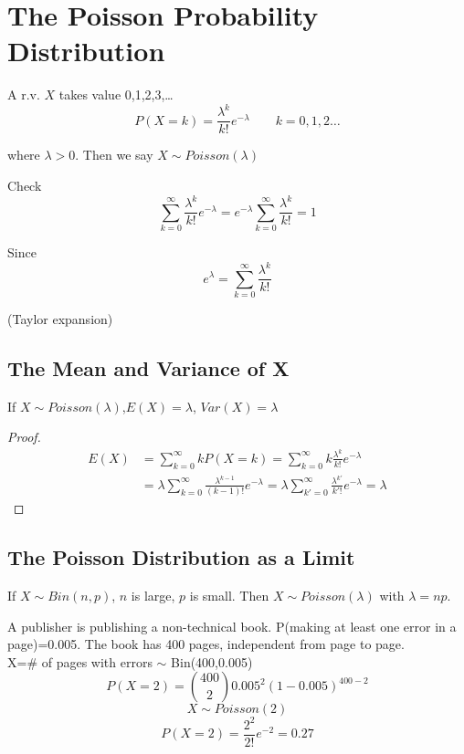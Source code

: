\section{The Poisson Probability Distribution}
\begin{defn}
A r.v. $X$ takes value 0,1,2,3,\dots
 \[P(X=k)=\frac{\lambda^k}{k!} e^{-\lambda} \qquad k=0,1,2\dots\]

where $\lambda >0$. Then we say $X \sim Poisson(\lambda)$
\end{defn}

Check
 \[\sum_{k=0}^{\infty} \frac{\lambda^k}{k!} e^{-\lambda}=e^{-\lambda} \sum_{k=0}^{\infty} \frac{\lambda^k}{k!} =1 \]

Since 
\[e^{\lambda}=\sum_{k=0}^{\infty} \frac{\lambda^k}{k!}  \]

(Taylor expansion)
\subsection{The Mean and Variance of X}
\begin{prop}
If $X \sim Poisson(\lambda)$,$E(X)=\lambda$, $Var(X)=\lambda$
\begin{proof}
\begin{align*}
E(X)&=\sum _{k=0}^{\infty}kP(X=k)=\sum _{k=0}^{\infty}  k \frac{\lambda^k}{k!} e^{-\lambda} \\
&=\lambda \sum _{k=0}^{\infty} \frac{\lambda^{k-1}}{(k-1)!} e^{-\lambda}=\lambda \sum _{k'=0}^{\infty} \frac{\lambda^{k'}}{k'!} e^{-\lambda}=\lambda
\end{align*}
\end{proof}
\end{prop}

\subsection{The Poisson Distribution as a Limit}
\begin{prop}
If $X \sim Bin(n,p)$, $n$ is large, $p$ is small. Then $X \sim Poisson(\lambda)$ with $\lambda=np$.
\end{prop}

\begin{exmp}
A publisher is publishing a non-technical book. P(making at least one error in a page)=0.005. The book has 400 pages, independent from page to page.\\
X=\# of pages with errors $\sim$ Bin(400,0.005)
\[P(X=2)=\binom {400}{2} 0.005^2 (1-0.005)^{400-2}\]
\[X \sim Poisson(2)\]
\[P(X=2)=\frac{2^2}{2!}e^{-2}=0.27\]
\end{exmp}

